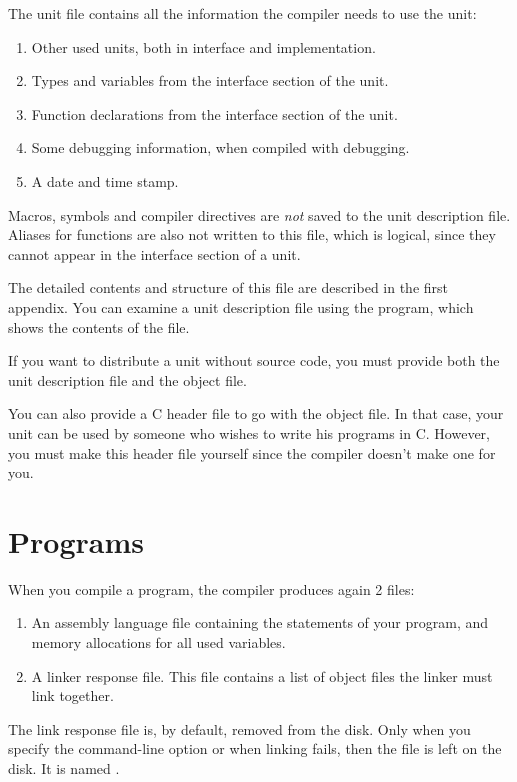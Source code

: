 The unit file contains all the information the compiler needs to use the
unit:
\begin{enumerate}
\item Other used units, both in interface and implementation.
\item Types and variables from the interface section of the unit.
\item Function declarations from the interface section of the unit.
\item Some debugging information, when compiled with debugging.
\item A date and time stamp.
\end{enumerate}
Macros, symbols and compiler directives are {\em not} saved to the unit
description file. Aliases for functions are also not written to this file,
which is logical, since they cannot appear in the interface section of a
unit.

The detailed contents and structure of this file are described in the first
appendix. You can examine a unit description file using the 
program, which shows the contents of the file.

If you want to distribute a unit without source code, you must provide both
the unit description file and the object file.

You can also provide a C header file to go with the object file. In that
case, your unit can be used by someone who wishes to write his programs in
C. However, you must make this header file yourself since the \fpc compiler
doesn't make one for you.

\section{Programs}
\label{se:Programs}

When you compile a program, the compiler produces again 2 files:
\begin{enumerate}
\item An assembly language file containing the statements of your program,
and memory allocations for all used variables.
\item A linker response file. This file contains a list of object files the
linker must link together.
\end{enumerate}
The link response file is, by default, removed from the disk. Only when you
specify the  command-line option or when linking fails, then the file
is left on the disk. It is named .

